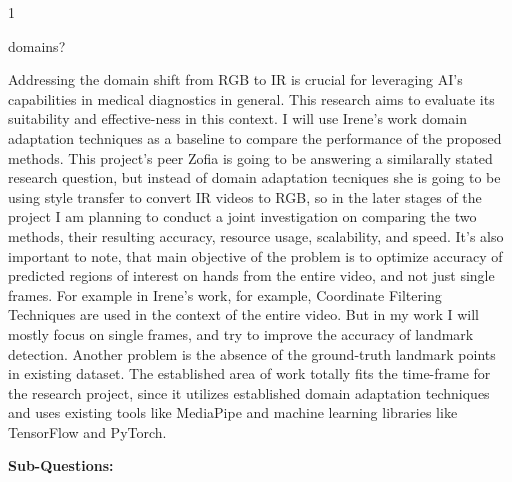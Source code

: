 \documentclass[
]{article}
\begin{document}
1

domains?

Addressing the domain shift from RGB to IR is crucial for leveraging
AI's capabilities in medical diagnostics in general. This research aims
to evaluate its suitability and effective-ness in this context. I will
use Irene's work domain adaptation techniques as a baseline to compare
the performance of the proposed methods. This project's peer Zofia is
going to be answering a similarally stated research question, but
instead of domain adaptation tecniques she is going to be using style
transfer to convert IR videos to RGB, so in the later stages of the
project I am planning to conduct a joint investigation on comparing the
two methods, their resulting accuracy, resource usage, scalability, and
speed. It's also important to note, that main objective of the problem
is to optimize accuracy of predicted regions of interest on hands from
the entire video, and not just single frames. For example in Irene's
work, for example, Coordinate Filtering Techniques are used in the
context of the entire video. But in my work I will mostly focus on
single frames, and try to improve the accuracy of landmark detection.
Another problem is the absence of the ground-truth landmark points in
existing dataset. The established area of work totally fits the
time-frame for the research project, since it utilizes established
domain adaptation techniques and uses existing tools like MediaPipe and
machine learning libraries like TensorFlow and PyTorch.

\textbf{Sub-Questions:}
\end{document}
